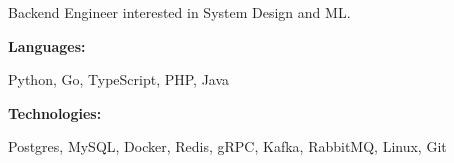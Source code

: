 \documentclass[9pt]{developercv} %
\begin{document}
\begin{minipage}[t]{0.5\textwidth}
	\vspace{-6pt}
	Backend Engineer interested in System Design and ML.
	\vspace{-6pt}
\end{minipage}
\hfill %
\begin{minipage}[t]{0.465\textwidth}
	\vspace{-6pt}

	\begin{minipage}[t]{0.2\textwidth}
		\textbf{Languages:}
	\end{minipage}
	\hfill
	\begin{minipage}[t]{0.73\textwidth}
		Python, Go, TypeScript, PHP, Java
	\end{minipage}
	\vspace{4mm}

	\begin{minipage}[t]{0.2\textwidth}
		\textbf{Technologies:}
	\end{minipage}
	\hfill
	\begin{minipage}[t]{0.73\textwidth}
		Postgres, MySQL, Docker, Redis, gRPC, Kafka, RabbitMQ, Linux, Git
	\end{minipage}

\end{minipage}
\end{document}

